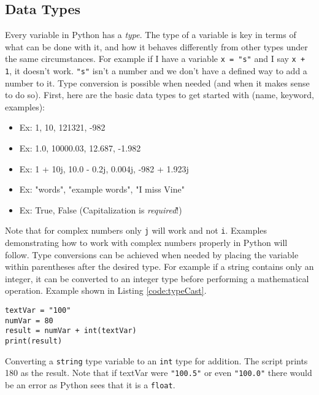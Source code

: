 \documentclass{book}
\begin{document}
\subsection{Data Types}\label{sec:dataTypes}
Every variable in Python has a \textit{type}. The type of a variable is key in terms of what can be done with it, and how it behaves differently from other types under the same circumstances. For example if I have a variable \texttt{x = "s"} and I say \texttt{x + 1}, it doesn't work. \texttt{"s"} isn't a number and we don't have a defined way to add a number to it. Type conversion is possible when needed (and when it makes sense to do so). First, here are the basic data types to get started with (name, keyword, examples):

\begin{itemize}
\item{  Ex: 1, 10, 121321, -982}
\item{  Ex: 1.0, 10000.03, 12.687, -1.982}
\item{  Ex: 1 + 10j, 10.0 - 0.2j, 0.004j, -982 + 1.923j}
\item{  Ex: "words", "example words", "I miss Vine"}
\item{  Ex: True, False (Capitalization is \textit{required}!)}
\end{itemize}

Note that for complex numbers only \texttt{j} will work and not \texttt{i}. Examples demonstrating how to work with complex numbers properly in Python will follow. Type conversions can be achieved when needed by placing the variable within parentheses after the desired type. For example if a string contains only an integer, it can be converted to an integer type before performing a mathematical operation. Example shown in Listing \ref{code:typeCast}.

\begin{listing}[htb]
\begin{mdframed}[backgroundcolor=codebg]
\begin{verbatim}
textVar = "100"
numVar = 80
result = numVar + int(textVar)
print(result)
\end{verbatim}
\end{mdframed}
\caption{Converting a \texttt{string} type variable to an \texttt{int} type for addition. The script prints 180 as the result. Note that if textVar were \texttt{"100.5"} or even \texttt{"100.0"} there would be an error as Python sees that it is a \texttt{float}.}
\label{code:typeCast}
\end{listing}
\end{document}
